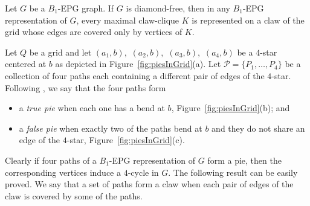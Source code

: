 \begin{lema}\label{lem:b1epgDiamondFree}
Let $G$ be a $B_1$-EPG graph. If $G$ is diamond-free, then in any $B_1$-EPG representation of $G$,  every maximal claw-clique $K$ is represented on a claw of the grid whose edges are covered only by vertices of $K$.
\end{lema}



Let $ Q $ be a grid and let $ (a_1, b),$ $(a_2, b),$ $(a_3, b),$ $(a_4, b)$ be a $4$-star centered at $b$ as depicted in Figure~\ref{fig:piesInGrid}(a). Let $ \mathcal{P} = \{P_1, \dots , P_4\}$ be a collection of four paths each containing a different pair of edges of the $4$-star.
Following \cite{golumbic2009}, we say that the four paths form
\begin{itemize}
\item a \emph{true pie} %
when each one has a bend at $b$, Figure~\ref{fig:piesInGrid}(b); and 
\item a \emph {false pie} when exactly two of the paths %
bend at $b$ and they do not share an edge of the $4$-star, Figure~\ref{fig:piesInGrid}(c). %



\end{itemize}

Clearly if four paths of a $B_1$-EPG representation of $G$ form a pie, then the corresponding vertices induce a $4$-cycle in $G$. %
The following result can be easily proved. We say that a set of paths form a claw when each pair of edges of the claw is covered by some of the paths.

